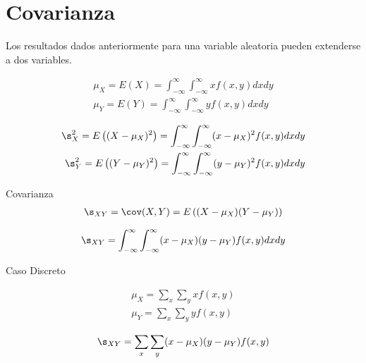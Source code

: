 \section{Covarianza}

Los resultados dados anteriormente para una variable aleatoria pueden extenderse a dos variables.


{}

\begin{equation}
 \label{eq:3.43}
 \begin{split}
  \mu_{X}=E(X)=\int_{-\infty}^{\infty}\int_{-\infty}^{\infty} xf(x,y)dxdy\\ 
  \mu_{Y}=E(Y)=\int_{-\infty}^{\infty}\int_{-\infty}^{\infty}
  yf(x,y)dxdy
 \end{split}
\end{equation}





\begin{equation}
 \label{eq:3.44}
 \begin{split}
  \s^{2}_{X}=E\left( (X-\mu_{X})^{2} \right)=\int_{-\infty}^{\infty}\int_{-\infty}^{\infty} (x-\mu_{X})^2f(x,y)dxdy\\ 
  \s^{2}_{Y}=E\left( (Y-\mu_{Y})^{2} \right)=\int_{-\infty}^{\infty}\int_{-\infty}^{\infty} (y-\mu_{Y})^2f(x,y)dxdy
 \end{split}
\end{equation}


{Covarianza}
 \begin{align}
 \label{eq:3.45}
  \s_{XY}=\cov(X,Y)=E\left( (X-\mu_{X})(Y-\mu_{Y}) \right)
 \end{align}



 \begin{align}
  \label{eq:3.46}
  \s_{XY}=\int_{-\infty}^{\infty}
  \int_{-\infty}^{\infty}
  (x-\mu_{X})(y-\mu_{Y})f(x,y)dxdy
 \end{align}


{Caso Discreto}

 \begin{equation}
  \begin{split}
   \mu_{X}=\sum_{x}\sum_{y}xf(x,y) \\
  \mu_{Y}=\sum_{x}\sum_{y}yf(x,y)
  \end{split}
 \end{equation}



 \begin{align}
  \label{eq:3.48}
  \s_{XY}=\sum_{x}\sum_{y}(x-\mu_{X})(y-\mu_{Y})f(x,y)
 \end{align}



